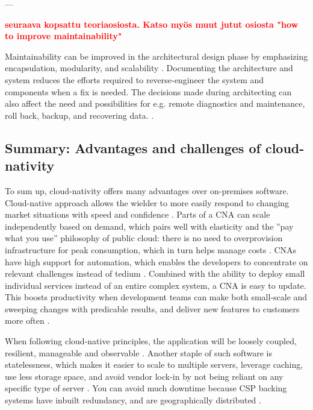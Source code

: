 \documentclass[utf8,english]{gradu3}
\newcommand{\todo}[1]{\textbf{\textcolor{red}{#1}}}
\begin{document}
---

\todo{seuraava kopsattu teoriaosiosta. Katso myös muut jutut osiosta "how to improve maintainability"}

Maintainability can be improved in the architectural design phase by emphasizing
encapsulation, modularity, and scalability \parencite{IEEE12207}.
Documenting the architecture and
system reduces the efforts required to reverse-engineer the system and
components when a fix is needed. The decisions made during architecting can also
affect the need and possibilities for e.g. remote diagnostics and maintenance,
roll back, backup, and recovering data. \parencite[95-96]{IEEE12207}.

\subsection{Summary: Advantages and challenges of cloud-nativity}

To sum up, cloud-nativity offers many advantages over on-premises software.
Cloud-native approach allows the wielder to more easily respond to changing
market situations with speed and confidence \parencite{Microsoft2022-CNA}. Parts of
a CNA can scale independently based on demand, which pairs well with elasticity
and the ''pay what you use'' philosophy of public cloud: there is no need to
overprovision infrastructure for peak consumption, which in turn helps manage
costs \parencite{Patrizio2018}. CNAs have high support for automation, which
enables the developers to concentrate on relevant challenges instead of tedium
\parencite{Patrizio2018}. Combined with the ability to deploy small individual
services instead of an entire complex system, a CNA is easy to update. This
boosts productivity when development teams can make both small-scale and
sweeping changes with predicable results, and deliver new features to customers
more often \parencite{CNAF2018, Patrizio2018}.

When following cloud-native principles, the application will be loosely coupled,
resilient, manageable and observable \parencite{CNAF2018}. Another staple of
such software is statelessness, which makes it easier to scale to multiple
servers, leverage caching, use less storage space, and avoid vendor lock-in by
not being reliant on any specific type of server \parencite{Patrizio2018}. You
can avoid much downtime because CSP backing systems have inbuilt redundancy, and
are geographically distributed \parencite{Patrizio2018}.
\end{document}
